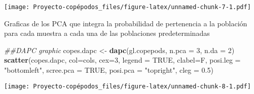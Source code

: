 \documentclass[]{article}
\newenvironment{Shaded}{\begin{snugshade}}{\end{snugshade}}
\newcommand{\CommentTok}[1]{\textcolor[rgb]{0.56,0.35,0.01}{\textit{#1}}}
\newcommand{\DataTypeTok}[1]{\textcolor[rgb]{0.13,0.29,0.53}{#1}}
\newcommand{\DecValTok}[1]{\textcolor[rgb]{0.00,0.00,0.81}{#1}}
\newcommand{\FloatTok}[1]{\textcolor[rgb]{0.00,0.00,0.81}{#1}}
\newcommand{\KeywordTok}[1]{\textcolor[rgb]{0.13,0.29,0.53}{\textbf{#1}}}
\newcommand{\NormalTok}[1]{#1}
\newcommand{\OtherTok}[1]{\textcolor[rgb]{0.56,0.35,0.01}{#1}}
\newcommand{\StringTok}[1]{\textcolor[rgb]{0.31,0.60,0.02}{#1}}
\begin{document}
\texttt{[image: Proyecto-copépodos\_files/figure-latex/unnamed-chunk-7-1.pdf]}

Graficas de los PCA que integra la probabilidad de pertenencia a la
población para cada muestra a cada una de las poblaciones
predeterminadas

\begin{Shaded}
\begin{Highlighting}[]
\CommentTok{##DAPC graphic}
\NormalTok{copes.dapc <-}\StringTok{ }\KeywordTok{dapc}\NormalTok{(gl.copepods, }\DataTypeTok{n.pca =} \DecValTok{3}\NormalTok{, }\DataTypeTok{n.da =} \DecValTok{2}\NormalTok{)}
\KeywordTok{scatter}\NormalTok{(copes.dapc, }\DataTypeTok{col=}\NormalTok{cols, }\DataTypeTok{cex=}\DecValTok{3}\NormalTok{, }\DataTypeTok{legend =} \OtherTok{TRUE}\NormalTok{, }\DataTypeTok{clabel=}\NormalTok{F, }\DataTypeTok{posi.leg =} \StringTok{"bottomleft"}\NormalTok{, }\DataTypeTok{scree.pca =} \OtherTok{TRUE}\NormalTok{, }\DataTypeTok{posi.pca =} \StringTok{"topright"}\NormalTok{, }\DataTypeTok{cleg =} \FloatTok{0.5}\NormalTok{)}
\end{Highlighting}
\end{Shaded}

\texttt{[image: Proyecto-copépodos\_files/figure-latex/unnamed-chunk-8-1.pdf]}
\end{document}
